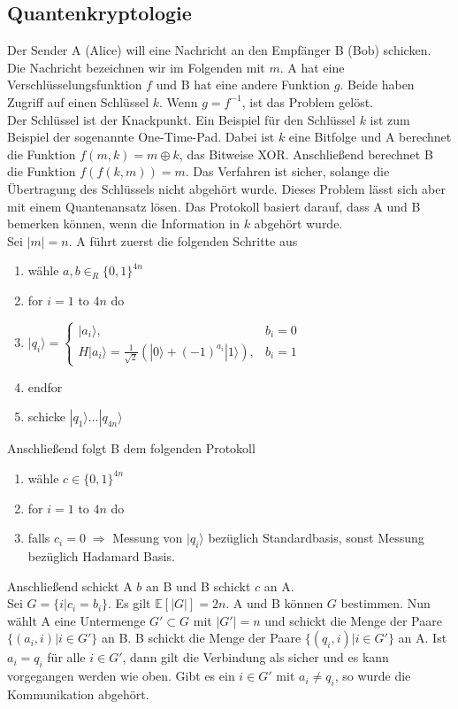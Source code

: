 \documentclass[a4paper, 12pt]{article}
\theoremstyle{plain}
\theoremstyle{definition}
\theoremstyle{lemma}
\theoremstyle{remark}
\theoremstyle{example}
\begin{document}
	\subsection{Quantenkryptologie}
	Der Sender A (Alice) will eine Nachricht an den Empfänger B (Bob) schicken. Die Nachricht bezeichnen wir im Folgenden mit $m$. A hat eine Verschlüsselungsfunktion $f$ und B hat eine andere Funktion $g$. Beide haben Zugriff auf einen Schlüssel $k$. Wenn $g = f^{-1}$, ist das Problem gelöst.\\
	Der Schlüssel ist der Knackpunkt. Ein Beispiel für den Schlüssel $k$ ist zum Beispiel der sogenannte One-Time-Pad. Dabei ist $k$ eine Bitfolge und A berechnet die Funktion $f(m,k) = m\oplus k$, das Bitweise XOR. Anschließend berechnet B die Funktion $f(f(k,m)) = m$. Das Verfahren ist sicher, solange die Übertragung des Schlüssels nicht abgehört wurde. Dieses Problem lässt sich aber mit einem Quantenansatz lösen. Das Protokoll basiert darauf, dass A und B bemerken können, wenn die Information in $k$ abgehört wurde.\\
	Sei $\left|m\right| = n$. A führt zuerst die folgenden Schritte aus
	\begin{enumerate}
		\item wähle $a,b \in _R \{0,1\}^{4n}$
		\item for $i=1$ to $4n$ do
		\item $|q_i\rangle = \begin{cases}
			|a_i\rangle, & b_i=0\\
			H|a_i\rangle = \frac{1}{\sqrt{2}} (|0\rangle + (-1)^{a_i} |1\rangle), & b_i = 1
		\end{cases}$
	\item endfor
	\item schicke $|q_1\rangle ... |q_{4n}\rangle$
	\end{enumerate}
	Anschließend folgt B dem folgenden Protokoll 
	\begin{enumerate}
		\item wähle $c \in \{0,1\}^{4n}$
		\item for $i=1$ to $4n$ do
		\item falls $c_i = 0 \; \Rightarrow $ Messung von $|q_i\rangle$ bezüglich Standardbasis, sonst Messung bezüglich Hadamard Basis.
	\end{enumerate}
	Anschließend schickt A $b$ an B und B schickt $c$ an A.\\
	Sei $G = \{i | c_i = b_i\}$. Es gilt $\mathbb{E}[\left|G\right|] = 2n$. A und B können $G$ bestimmen. Nun wählt A eine Untermenge $G' \subset G$ mit $\left|G'\right| = n$ und schickt die Menge der Paare $\{(a_i,i) | i \in G'\}$ an B. B schickt die Menge der Paare $\{(q_i,i)| i \in G'\}$ an A. Ist $a_i = q_i$ für alle $i \in G'$, dann gilt die Verbindung als sicher und es kann vorgegangen werden wie oben. Gibt es ein $i \in G'$ mit $a_i \neq q_i$, so wurde die Kommunikation abgehört.\\
\end{document}
